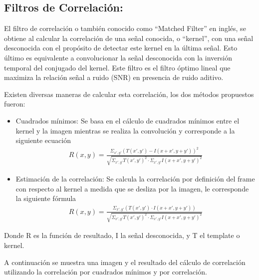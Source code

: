 \subsection{Filtros de Correlación:}
\label{sec:corr}
El filtro de correlación o también conocido como ``Matched Filter''  \cite{ref:Corr}  en inglés, se obtiene al calcular la correlación de una señal conocida, o ``kernel'', con una señal desconocida con el propósito de detectar este kernel en la última señal. Esto último es equivalente a convolucionar la señal desconocida con la inversión temporal del conjugado del kernel. Este filtro es el filtro óptimo lineal que maximiza la relación señal a ruido (SNR) en presencia de ruido aditivo.

Existen diversas maneras de calcular esta correlación, los dos métodos propuestos fueron:
\begin{itemize}
\item Cuadrados mínimos:
Se basa en el cálculo de cuadrados mínimos entre el kernel y la imagen mientras se realiza la convolución y corresponde a la siguiente ecuación
\begin{align}
R(x,y) = \frac{\Sigma_{x',y'} \left( T(x',y') - I(x+x',y+y') \right)^2}{\sqrt{\Sigma_{x',y'} T(x',y')^2  \cdot \Sigma_{x',y'}  I(x+x',y+y')^2}}
\end{align}
\item Estimación de la correlación:
Se calcula la correlación por definición del frame con respecto al kernel a medida que se desliza por la imagen, le corresponde la siguiente fórmula
\begin{align}
R(x,y) = \frac{\Sigma_{x',y'} \left( T(x',y') \cdot I(x+x',y+y') \right)}{\sqrt{\Sigma_{x',y'} T(x',y')^2  \cdot \Sigma_{x',y'}  I(x+x',y+y')^2}}
\end{align}
\end{itemize}
Donde R es la función de resultado, I la señal desconocida, y T el template o kernel.

A continuación se muestra una imagen y el resultado del cálculo de correlación utilizando la correlación por cuadrados mínimos y por correlación.



